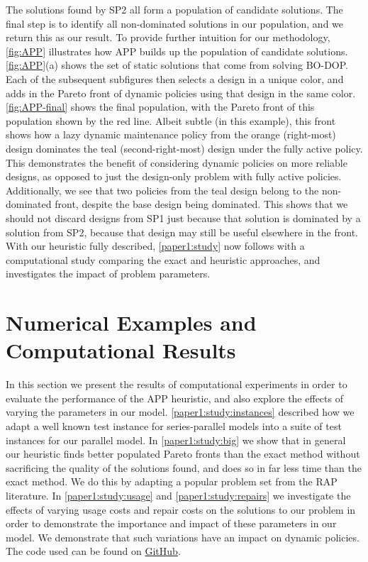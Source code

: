 \documentclass[11pt,authoryear,a4paper]{article}
\theoremstyle{definition}
\begin{document}
The solutions found by SP2 all form a population of candidate solutions. The final step is to identify all non-dominated solutions in our population, and we return this as our result. To provide further intuition for our methodology, \autoref{fig:APP} illustrates how APP builds up the population of candidate solutions. \autoref{fig:APP}(a) shows the set of static solutions that come from solving BO-DOP. Each of the subsequent subfigures then selects a design in a unique color, and adds in the Pareto front of dynamic policies using that design in the same color. \autoref{fig:APP-final} shows the final population, with the Pareto front of this population shown by the red line. {Albeit subtle (in this example), this front shows how a lazy dynamic maintenance policy from the orange (right-most) design dominates the teal (second-right-most) design under the fully active policy. This demonstrates the benefit of considering dynamic policies on more reliable designs, as opposed to just the design-only problem with fully active policies. Additionally, we see that two policies from the teal design belong to the non-dominated front, despite the base design being dominated. This shows that we should not discard designs from SP1 just because that solution is dominated by a solution from SP2, because that design may still be useful elsewhere in the front.}
With our heuristic fully described, \autoref{paper1:study} now follows with a computational study comparing the exact and heuristic approaches, and investigates the impact of problem parameters.





\section{Numerical Examples and Computational Results}
\label{paper1:study}


In this section we present the results of computational experiments in order to evaluate the performance of the APP heuristic, and also explore the effects of varying the parameters in our model. \autoref{paper1:study:instances} described how we adapt a well known test instance for series-parallel models into a suite of test instances for our parallel model. In \autoref{paper1:study:big} we show that in general our heuristic finds better populated Pareto fronts than the exact method without sacrificing the quality of the solutions found, and does so in far less time than the exact method. We do this by adapting a popular problem set from the RAP literature. In \autoref{paper1:study:usage} and \autoref{paper1:study:repairs} we investigate the effects of varying usage costs and repair costs on the solutions to our problem in order to demonstrate the importance and impact of these parameters in our model. %
We demonstrate that such variations have an impact on dynamic policies. The code used can be found on \href{https://github.com/fairleyl/MDP-Design-Parallel}{GitHub}.
\end{document}
